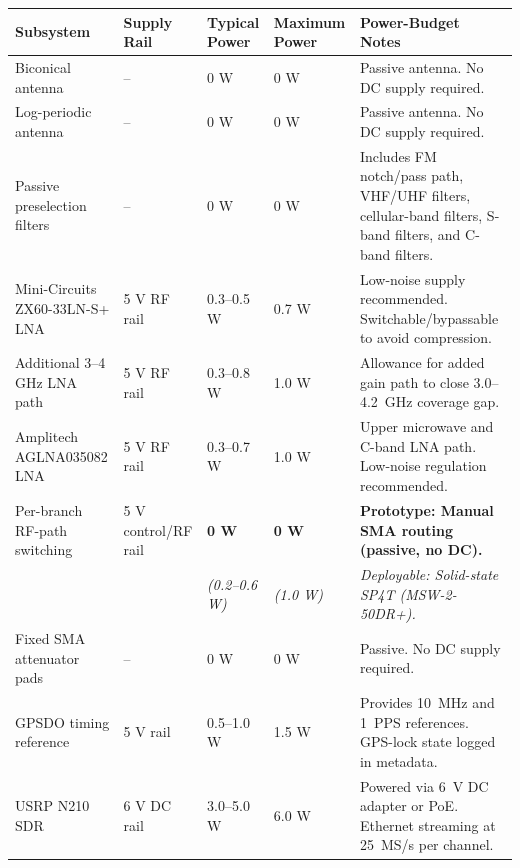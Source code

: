 \documentclass[11pt,a4paper]{article}
\begin{document}
	\begin{table}[htbp]
		\centering
		\scriptsize
		\begin{tabular}{p{4.0cm}p{2.0cm}p{2.2cm}p{2.2cm}p{4.2cm}}
			\toprule
			\textbf{Subsystem} &
			\textbf{Supply Rail} &
			\textbf{Typical Power} &
			\textbf{Maximum Power} &
			\textbf{Power-Budget Notes} \\
			\midrule
			
			Biconical antenna &
			-- &
			0 W &
			0 W &
			Passive antenna. No DC supply required. \\
			
			Log-periodic antenna &
			-- &
			0 W &
			0 W &
			Passive antenna. No DC supply required. \\
			
			Passive preselection filters &
			-- &
			0 W &
			0 W &
			Includes FM notch/pass path, VHF/UHF filters, cellular-band filters,
			S-band filters, and C-band filters. \\
			
			Mini-Circuits ZX60-33LN-S+ LNA &
			5 V RF rail &
			0.3--0.5 W &
			0.7 W &
			Low-noise supply recommended. Switchable/bypassable to avoid compression. \\
			
			Additional 3--4 GHz LNA path &
			5 V RF rail &
			0.3--0.8 W &
			1.0 W &
			Allowance for added gain path to close 3.0--4.2~GHz coverage gap. \\
			
			Amplitech AGLNA035082 LNA &
			5 V RF rail &
			0.3--0.7 W &
			1.0 W &
			Upper microwave and C-band LNA path. Low-noise regulation recommended. \\
			
			Per-branch RF-path switching &
			5 V control/RF rail &
			\textbf{0 W} &
			\textbf{0 W} &
			\textbf{Prototype: Manual SMA routing (passive, no DC).} \\
			& & \textit{(0.2--0.6 W)} & \textit{(1.0 W)} & \textit{Deployable: Solid-state SP4T (MSW-2-50DR+).} \\
			
			Fixed SMA attenuator pads &
			-- &
			0 W &
			0 W &
			Passive. No DC supply required. \\
			
			GPSDO timing reference &
			5 V rail &
			0.5--1.0 W &
			1.5 W &
			Provides 10~MHz and 1~PPS references. GPS-lock state logged in metadata. \\
			
			USRP N210 SDR &
			6 V DC rail &
			3.0--5.0 W &
			6.0 W &
			Powered via 6~V DC adapter or PoE. Ethernet streaming at 25~MS/s per channel. \\
			

\end{tabular}
\end{table}
\end{document}
